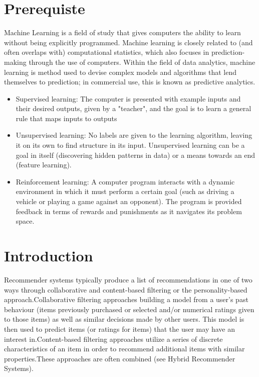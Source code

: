 \documentclass[paper=a4, fontsize=11pt]{scrartcl}
\numberwithin{equation}{section}		%
\numberwithin{figure}{section}			%
\numberwithin{table}{section}				%
\begin{document}
\section{Prerequiste}
Machine Learning is a field of study that gives computers the ability to learn without being explicitly programmed. Machine learning is closely related to (and often overlaps with) computational statistics, which also focuses in prediction-making through the use of computers. Within the field of data analytics, machine learning is method used to devise complex models and algorithms that lend themselves to prediction; in commercial use, this is known as predictive analytics.
\begin{itemize}	
  \item Supervised learning: The computer is presented with example inputs and their desired outputs, given by a "teacher", and the goal is to learn a general rule that maps inputs to outputs
  \item Unsupervised learning: No labels are given to the learning algorithm, leaving it on its own to find structure in its input. Unsupervised learning can be a goal in itself (discovering hidden patterns in data) or a means towards an end (feature learning).
  \item  Reinforcement learning: A computer program interacts with a dynamic environment in which it must perform a certain goal (such as driving a vehicle or playing a game against an opponent). The program is provided feedback in terms of rewards and punishments as it navigates its problem space. 
\end{itemize}

\section{Introduction}

Recommender systems typically produce a list of recommendations in one of two ways through collaborative and content-based filtering or the personality-based approach.Collaborative filtering approaches building a model from a user's past behaviour (items previously purchased or selected and/or numerical ratings given to those items) as well as similar decisions made by other users. This model is then used to predict items (or ratings for items) that the user may have an interest in.Content-based filtering approaches utilize a series of discrete characteristics of an item in order to recommend additional items with similar properties.These approaches are often combined (see Hybrid Recommender Systems).
\end{document}
